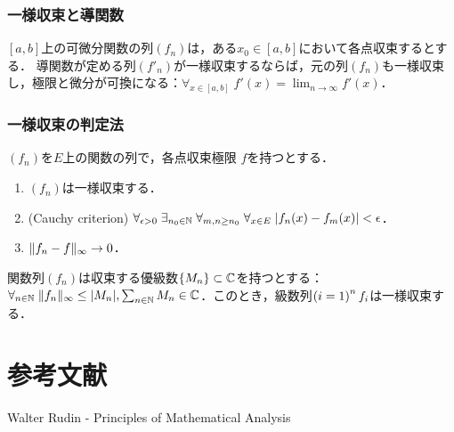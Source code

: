 \documentclass[uplatex, dvipdfmx]{jsreport}
\begin{document}
\subsection{一様収束と導関数}

\begin{theorem}
    $[a,b]$上の可微分関数の列$(f_n)$は，ある$x_0\in[a,b]$において各点収束するとする．
    導関数が定める列$(f'_n)$が一様収束するならば，元の列$(f_n)$も一様収束し，極限と微分が可換になる：$\forall_{x\in[a,b]}\;f'(x)=\lim_{n\to\infty}f'(x)$．
\end{theorem}

\subsection{一様収束の判定法}

\begin{proposition}[一様収束の判定法]
    $(f_n)$を$E$上の関数の列で，各点収束極限
    $f$を持つとする．
    \begin{enumerate}
        \item $(f_n)$は一様収束する．
        \item (Cauchy criterion) $\forall_{\epsilon>0}\;\exists_{n_0\in\mathbb{N}}\;\forall_{m,n\ge n_0}\;\forall_{x\in E}\;\lvert f_n(x)-f_m(x)\rvert<\epsilon$．
        \item $\|f_n-f\|_\infty\to0$．
    \end{enumerate}
\end{proposition}

\begin{proposition}
    関数列$(f_n)$は収束する優級数$\{M_n\}\subset\mathbb{C}$を持つとする：$\forall_{n\in\mathbb{N}}\;\|f_n\|_\infty\le\lvert M_n\rvert,\sum_{n\in\mathbb{N}}M_n\in\mathbb{C}$．このとき，級数列$\left(i=1\right)^nf_i$は一様収束する．
\end{proposition}

\chapter{参考文献}

\begin{thebibliography}{9}
    Walter Rudin - Principles of Mathematical Analysis
\end{thebibliography}
\end{document}
